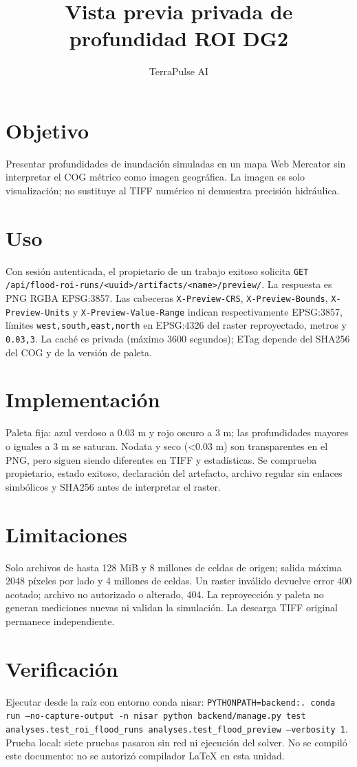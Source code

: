 \documentclass[11pt]{article}
\begin{document}
\title{Vista previa privada de profundidad ROI DG2}
\author{TerraPulse AI}
\date{}
\maketitle
\section{Objetivo}
Presentar profundidades de inundación simuladas en un mapa Web Mercator sin interpretar el COG métrico como imagen geográfica. La imagen es solo visualización; no sustituye al TIFF numérico ni demuestra precisión hidráulica.
\section{Uso}
Con sesión autenticada, el propietario de un trabajo exitoso solicita
\texttt{GET /api/flood-roi-runs/<uuid>/artifacts/<name>/preview/}.
La respuesta es PNG RGBA EPSG:3857. Las cabeceras
\texttt{X-Preview-CRS}, \texttt{X-Preview-Bounds}, \texttt{X-Preview-Units} y
\texttt{X-Preview-Value-Range} indican respectivamente EPSG:3857, límites
\texttt{west,south,east,north} en EPSG:4326 del raster reproyectado, metros y
\texttt{0.03,3}. La caché es privada (máximo 3600 segundos); ETag depende del SHA256 del COG y de la versión de paleta.
\section{Implementación}
Paleta fija: azul verdoso a 0.03 m y rojo oscuro a 3 m; las profundidades mayores o iguales a 3 m se saturan. Nodata y seco (<0.03 m) son transparentes en el PNG, pero siguen siendo diferentes en TIFF y estadísticas. Se comprueba propietario, estado exitoso, declaración del artefacto, archivo regular sin enlaces simbólicos y SHA256 antes de interpretar el raster.
\section{Limitaciones}
Solo archivos de hasta 128 MiB y 8 millones de celdas de origen; salida máxima 2048 píxeles por lado y 4 millones de celdas. Un raster inválido devuelve error 400 acotado; archivo no autorizado o alterado, 404. La reproyección y paleta no generan mediciones nuevas ni validan la simulación. La descarga TIFF original permanece independiente.
\section{Verificación}
Ejecutar desde la raíz con entorno conda nisar:
\texttt{PYTHONPATH=backend:. conda run --no-capture-output -n nisar python backend/manage.py test analyses.test\_roi\_flood\_runs analyses.test\_flood\_preview --verbosity 1}.
Prueba local: siete pruebas pasaron sin red ni ejecución del solver. No se compiló este documento: no se autorizó compilador LaTeX en esta unidad.
\end{document}
